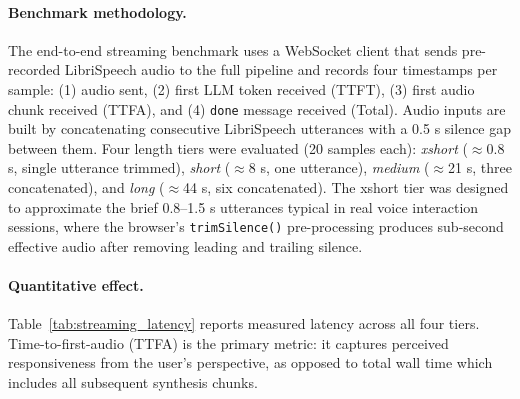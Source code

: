 \documentclass[12pt, a4paper]{article}
\begin{document}
\paragraph{Benchmark methodology.}
The end-to-end streaming benchmark uses a WebSocket client that sends pre-recorded LibriSpeech audio to the full pipeline and records four timestamps per sample: (1) audio sent, (2) first LLM token received (TTFT), (3) first audio chunk received (TTFA), and (4) \texttt{done} message received (Total). Audio inputs are built by concatenating consecutive LibriSpeech utterances with a 0.5 s silence gap between them. Four length tiers were evaluated (20 samples each): \textit{xshort} ($\approx$0.8 s, single utterance trimmed), \textit{short} ($\approx$8 s, one utterance), \textit{medium} ($\approx$21 s, three concatenated), and \textit{long} ($\approx$44 s, six concatenated). The xshort tier was designed to approximate the brief 0.8--1.5 s utterances typical in real voice interaction sessions, where the browser's \texttt{trimSilence()} pre-processing produces sub-second effective audio after removing leading and trailing silence.

\paragraph{Quantitative effect.}
Table~\ref{tab:streaming_latency} reports measured latency across all four tiers. Time-to-first-audio (TTFA) is the primary metric: it captures perceived responsiveness from the user's perspective, as opposed to total wall time which includes all subsequent synthesis chunks.
\begin{table}[H]
\centering
\caption{Streaming pipeline latency by input tier (20 samples each, mean $\pm$ std, CUDA).}
\label{tab:streaming_latency}
\end{table}
\end{document}
